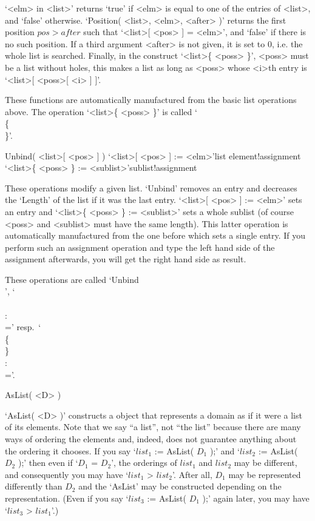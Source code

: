 `<elm> in <list>' returns `true' if <elm> is equal to  one of the entries
of  <list>, and `false'  otherwise. `Position( <list>,  <elm>, <after> )'
returns the first position $pos  > after$  such  that `<list>[ <pos> ]  =
<elm>', and `false' if  there is no  such  position. If a third  argument
<after> is  not given, it is  set to 0, i.e.  the whole list is searched.
Finally, in  the construct `<list>\{  <poss> \}',  <poss> must  be a list
without holes, this makes a  list as long as <poss>  whose <i>th entry is
`<list>[ <poss>[ <i> ] ]'.

These  functions  are automatically  manufactured    from the basic  list
operations   above.  The  operation  `<list>\{    <poss>  \}' is   called
`\\\{\\\}'.

\>Unbind( <list>[ <pos> ] )
\>`<list>[ <pos> ] := <elm>'{list element!assignment}
\>`<list>\{ <poss> \} := <sublist>'{sublist!assignment}

These   operations modify a  given  list.  `Unbind'  removes an entry and
decreases  the `Length' of the list  if it was  the  last entry. `<list>[
<pos> ]  := <elm>' sets an  entry  and `<list>\{ <poss> \}  := <sublist>'
sets a whole sublist  (of course <poss> and <sublist>  must have the same
length). This latter operation is automatically manufactured from the one
before  which sets a  single entry.  If  you  perform such an  assignment
operation and type  the left hand side of  the assignment afterwards, you
will get the right hand side as result.

These     operations      are    called   `Unbind\\[\\]',  `\\[\\]\\:\\='
resp.~`\\\{\\\}\\:\\='.

\null

\>AsList( <D> )

`AsList( <D> )' constructs a {\GAP} object that represents a domain as if
it  were a list of its  elements. Note that we  say ``a list'', not ``the
list'' because there are many ways of ordering  the elements and, indeed,
{\GAP} does not guarantee anything about  the ordering it chooses. If you
say `$list_1$  := AsList( $D_1$ );'  and  `$list_2$ := AsList(  $D_2$ );'
then even if `$D_1$ = $D_2$', the orderings  of $list_1$ and $list_2$ may
be  different, and consequently you   may  have `$list_1$ \<>  $list_2$'.
After all, $D_1$ may  be   represented differently  than $D_2$  and   the
`AsList' may be constructed depending on the representation. (Even if you
say  `$list_3$ := AsList( $D_1$  );' again later,  you may have `$list_3$
\<> $list_1$'.)

